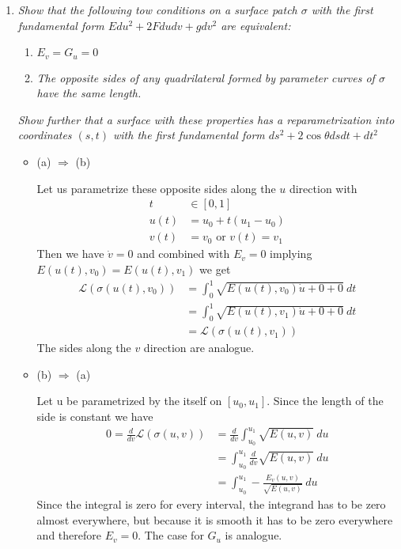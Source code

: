 \documentclass[a4paper,11pt,notitlepage,fullpage]{article}
\begin{document}
\begin{enumerate}
\item \emph{Show that the following tow conditions on a surface patch $\sigma$ with the first fundamental form $Edu^2 + 2Fdudv + gdv^2$ are equivalent:}
\begin{enumerate}
\item \emph{$E_v = G_u = 0$}
\item \emph{The opposite sides of any quadrilateral formed by parameter curves of $\sigma$ have the same length.}
\end{enumerate}
\emph{Show further that a surface with these properties has a reparametrization into coordinates $\left(s,t\right)$ with the first fundamental form $ds^2 + 2\cos \theta dsdt + dt^2$}

\begin{figure}[H]
\centering
\def\svgwidth{0.4\textwidth}

\end{figure}

\begin{itemize}
\item (a) $\Rightarrow$ (b)

Let us parametrize these opposite sides along the $u$ direction with
\begin{align*}
t &\in [0, 1] \\
u\left(t\right) &= u_0 + t\left(u_1-u_0\right) \\
v\left(t\right) &= v_0\text{ or }v\left(t\right) = v_1
\end{align*}
Then we have $\dot v = 0$ and combined with $E_v = 0$ implying $E\left(u\left(t\right), v_0\right) = E\left(u\left(t\right), v_1\right)$ we get
\begin{align*}
\mathcal L\left(\sigma\left(u\left(t\right), v_0\right)\right) &= \int_0^1 \sqrt{E\left(u\left(t\right), v_0\right)\dot u + 0 + 0}~dt \\
&= \int_0^1 \sqrt{E\left(u\left(t\right), v_1\right)\dot u + 0 + 0}~dt \\
&= \mathcal L\left(\sigma\left(u\left(t\right), v_1\right)\right)
\end{align*}
The sides along the $v$ direction are analogue.

\item (b) $\Rightarrow$ (a)

Let u be parametrized by the itself on $[u_0, u_1]$. Since the length of the side is constant we have
\begin{align*}
0 = \frac{d}{dv} \mathcal L\left(\sigma\left(u, v\right)\right) &= \frac{d}{dv} \int_{u_0}^{u_1} \sqrt{E\left(u, v\right)}~du \\
&= \int_{u_0}^{u_1} \frac{d}{dv} \sqrt{E\left(u, v\right)}~du \\
&= \int_{u_0}^{u_1} -\frac{E_v\left(u, v\right)}{\sqrt{E\left(u, v\right)}} ~du
\end{align*}
Since the integral is zero for every interval, the integrand has to be zero almost everywhere, but because it is smooth it has to be zero everywhere and therefore $E_v = 0$. The case for $G_u$ is analogue.
\end{itemize}


\end{enumerate}
\end{document}
